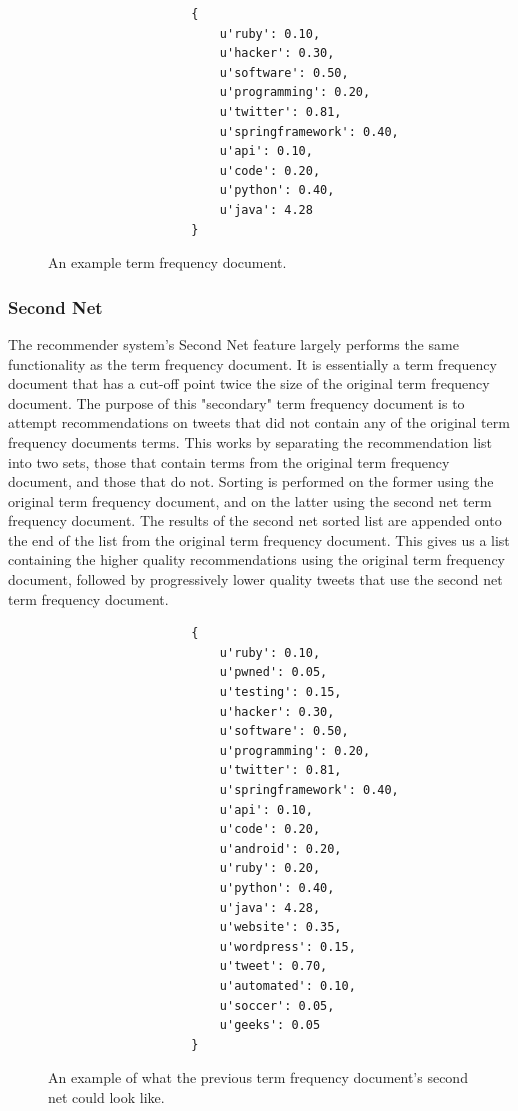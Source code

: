 \documentclass{article}
\begin{document}
\begin{figure}[H]
\centering
\begin{verbatim}
                    {
                        u'ruby': 0.10, 
                        u'hacker': 0.30, 
                        u'software': 0.50, 
                        u'programming': 0.20, 
                        u'twitter': 0.81, 
                        u'springframework': 0.40, 
                        u'api': 0.10, 
                        u'code': 0.20, 
                        u'python': 0.40, 
                        u'java': 4.28
                    }
\end{verbatim}
\caption{An example term frequency document.}
\end{figure}


\subsubsection*{Second Net} %
The recommender system's Second Net feature largely performs the same functionality as the term frequency document. It is essentially a term frequency document that has a cut-off point twice the size of the original term frequency document. The purpose of this "secondary" term frequency document is to attempt recommendations on tweets that did not contain any of the original term frequency documents terms. This works by separating the recommendation list into two sets, those that contain terms from the original term frequency document, and those that do not. Sorting is performed on the former using the original term frequency document, and on the latter using the second net term frequency document. The results of the second net sorted list are appended onto the end of the list from the original term frequency document. This gives us a list containing the higher quality recommendations using the original term frequency document, followed by progressively lower quality tweets that use the second net term frequency document.

\begin{figure}[H]
\centering
\begin{verbatim}
                    {
                        u'ruby': 0.10, 
                        u'pwned': 0.05, 
                        u'testing': 0.15, 
                        u'hacker': 0.30, 
                        u'software': 0.50, 
                        u'programming': 0.20, 
                        u'twitter': 0.81, 
                        u'springframework': 0.40, 
                        u'api': 0.10, 
                        u'code': 0.20, 
                        u'android': 0.20, 
                        u'ruby': 0.20, 
                        u'python': 0.40, 
                        u'java': 4.28, 
                        u'website': 0.35, 
                        u'wordpress': 0.15, 
                        u'tweet': 0.70, 
                        u'automated': 0.10, 
                        u'soccer': 0.05, 
                        u'geeks': 0.05
                    }
\end{verbatim}
\caption{An example of what the previous term frequency document's second net could look like.}
\end{figure}
    
\end{document}
